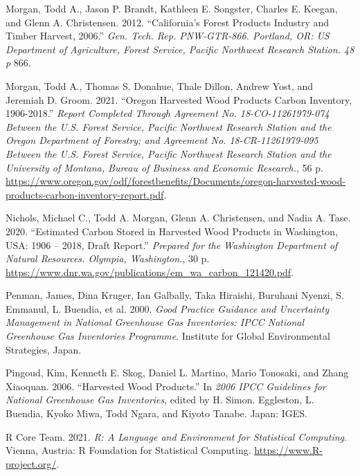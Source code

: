 \documentclass[
  openany]{book}
\newlength{\cslhangindent}
\newlength{\cslentryspacingunit} %
\newenvironment{CSLReferences}[2] %
 {%
  \setlength{\parindent}{0pt}
  \ifodd #1
  \let\oldpar\par
  \def\par{\hangindent=\cslhangindent\oldpar}
  \fi
  \setlength{\parskip}{#2\cslentryspacingunit}
 }%
 {}
\begin{document}
\begin{CSLReferences}{1}{0}
\leavevmode{}%
Morgan, Todd A., Jason P. Brandt, Kathleen E. Songster, Charles E.
Keegan, and Glenn A. Christensen. 2012. {``California's Forest Products
Industry and Timber Harvest, 2006.''} \emph{Gen. Tech. Rep. PNW-GTR-866.
Portland, OR: US Department of Agriculture, Forest Service, Pacific
Northwest Research Station. 48 p} 866.

\leavevmode{}%
Morgan, Todd A., Thomas S. Donahue, Thale Dillon, Andrew Yost, and
Jeremiah D. Groom. 2021. {``Oregon Harvested Wood Products Carbon
Inventory, 1906-2018.''} \emph{Report Completed Through Agreement No.
18-CO-11261979-074 Between the U.S. Forest Service, Pacific Northwest
Research Station and the Oregon Department of Forestry; and Agreement
No. 18-CR-11261979-095 Between the U.S. Forest Service, Pacific
Northwest Research Station and the University of Montana, Bureau of
Business and Economic Research.}, 56 p.
\url{https://www.oregon.gov/odf/forestbenefits/Documents/oregon-harvested-wood-products-carbon-inventory-report.pdf}.

\leavevmode{}%
Nichols, Michael C., Todd A. Morgan, Glenn A. Christensen, and Nadia A.
Tase. 2020. {``Estimated Carbon Stored in Harvested Wood Products in
Washington, USA: 1906 -- 2018, Draft Report.''} \emph{Prepared for the
Washington Department of Natural Resources. Olympia, Washington.}, 30 p.
\url{https://www.dnr.wa.gov/publications/em_wa_carbon_121420.pdf}.

\leavevmode{}%
Penman, James, Dina Kruger, Ian Galbally, Taka Hiraishi, Buruhani
Nyenzi, S. Emmanul, L. Buendia, et al. 2000. \emph{Good Practice
Guidance and Uncertainty Management in National Greenhouse Gas
Inventories: IPCC National Greenhouse Gas Inventories Programme}.
Institute for Global Environmental Strategies, Japan.

\leavevmode{}%
Pingoud, Kim, Kenneth E. Skog, Daniel L. Martino, Mario Tonosaki, and
Zhang Xiaoquan. 2006. {``Harvested Wood Products.''} In \emph{2006 IPCC
Guidelines for National Greenhouse Gas Inventories}, edited by H. Simon.
Eggleston, L. Buendia, Kyoko Miwa, Todd Ngara, and Kiyoto Tanabe. Japan:
IGES.

\leavevmode{}%
R Core Team. 2021. \emph{R: A Language and Environment for Statistical
Computing}. Vienna, Austria: R Foundation for Statistical Computing.
\url{https://www.R-project.org/}.


\end{CSLReferences}
\end{document}
